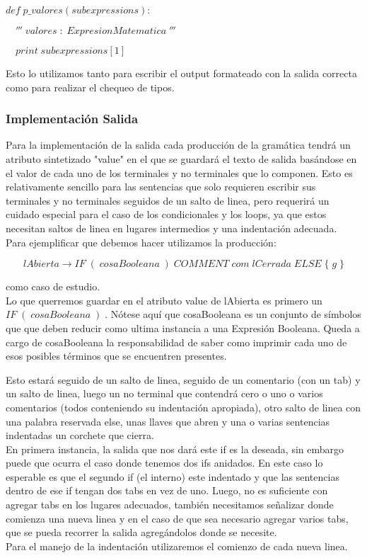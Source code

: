 $def\; p\_valores(subexpressions):$

$\quad'''\; valores\; :\; ExpresionMatematica\;'''$

$\quad print\; subexpressions[1]$


Esto lo utilizamos tanto para escribir el output formateado con la salida correcta como para realizar el chequeo de tipos.

\subsubsection{Implementación Salida}

Para la implementación de la salida cada producción de la gramática tendrá un atributo sintetizado "value" en el que se guardará el texto de salida basándose en el valor de cada uno de los terminales y no terminales que lo componen. Esto es relativamente sencillo para las sentencias que solo requieren escribir sus terminales y no terminales seguidos de un salto de linea, pero requerirá un cuidado especial para el caso de los condicionales y los loops, ya que estos necesitan saltos de linea en lugares intermedios y una indentación adecuada.
\\
Para ejemplificar que debemos hacer utilizamos la producción:

$$lAbierta \rightarrow IF\; (\; cosaBooleana\; )\; COMMENT\; com\; lCerrada\; ELSE\; \{\; g\; \}$$ 

como caso de estudio.
\\
Lo que querremos guardar en el atributo value de lAbierta es primero un $IF\; (\; cosaBooleana\; )\;$. Nótese aquí que cosaBooleana es un conjunto de símbolos que que deben reducir como ultima instancia a una Expresión Booleana. Queda a cargo de cosaBooleana la responsabilidad de saber como imprimir cada uno de esos posibles términos que se encuentren presentes.

Esto estará seguido de un salto de linea, seguido de un comentario (con un tab) y un salto de linea, luego un no terminal que contendrá cero o uno o varios comentarios (todos conteniendo su indentación apropiada), otro salto de linea con una palabra reservada else, unas llaves que abren y una o varias sentencias indentadas un corchete que cierra.
\\
En primera instancia, la salida que nos dará este if es la deseada, sin embargo puede que ocurra el caso donde tenemos dos ifs anidados. En este caso lo esperable es que el segundo if (el interno) este indentado y que las sentencias dentro de ese if tengan dos tabs en vez de uno. Luego, no es suficiente con agregar tabs en los lugares adecuados, también necesitamos señalizar donde comienza una nueva linea y en el caso de que sea necesario agregar varios tabs, que se pueda recorrer la salida agregándolos donde se necesite.
\\
Para el manejo de la indentación utilizaremos el comienzo de cada nueva linea.

